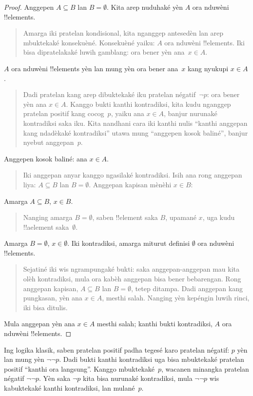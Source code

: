 \documentclass[../../../include/open-logic-section]{subfiles}
\begin{document}
\begin{proof}
  Anggepen $A \subseteq B$ lan $B = \emptyset$.
  Kita arep nuduhaké yèn $A$ ora nduwèni !!{element}s.
  \begin{quote}
    Amarga iki pratelan kondisional, kita nganggep
    antesedèn lan arep mbuktekaké konsekuèné.
    Konsekuèné yaiku: $A$ ora nduwèni !!{element}s.
    Iki bisa dipratelakaké luwih gamblang: ora bener
    yèn ana~$x \in A$.
  \end{quote}
  $A$ ora nduwèni !!{element}s yèn lan mung yèn
  ora bener ana~$x$ kang nyukupi $x \in A$.
  \begin{quote}
    Dadi pratelan kang arep dibuktekaké iku pratelan
    négatif~$\lnot p$: ora bener yèn ana $x \in A$.
    Kanggo bukti kanthi kontradiksi, kita kudu nganggep
    pratelan positif kang cocog~$p$, yaiku ana
    $x \in A$, banjur nurunaké kontradiksi saka iku.
    Kita nandhani cara iki kanthi nulis
    ``kanthi anggepan kang ndadèkaké kontradiksi''
    utawa mung ``anggepen kosok baliné'', banjur
    nyebut anggepan~$p$.
  \end{quote}
  Anggepen kosok baliné: ana $x \in A$.
  \begin{quote}
    Iki anggepan anyar kanggo ngasilaké kontradiksi.
    Isih ana rong anggepan liya: $A \subseteq B$
    lan $B = \emptyset$. Anggepan kapisan mènèhi
    $x \in B$:
  \end{quote}
  Amarga $A \subseteq B$, $x \in B$.
  \begin{quote}
    Nanging amarga $B = \emptyset$, saben !!{element}
    saka $B$, upamané $x$, uga kudu !!a{element}
    saka~$\emptyset$.
  \end{quote}
  Amarga $B = \emptyset$, $x \in \emptyset$.
  Iki kontradiksi, amarga miturut definisi $\emptyset$
  ora nduwèni !!{element}s.
  \begin{quote}
    Sejatiné iki wis ngrampungaké bukti: saka
    anggepan-anggepan mau kita olèh kontradiksi,
    mula ora kabèh anggepan bisa bener bebarengan.
    Rong anggepan kapisan, $A \subseteq B$ lan
    $B = \emptyset$, tetep ditampa. Dadi anggepan
    kang pungkasan, yèn ana $x \in A$, mesthi salah.
    Nanging yèn kepéngin luwih rinci, iki bisa ditulis.
  \end{quote}
  Mula anggepan yèn ana $x \in A$ mesthi salah;
  kanthi bukti kontradiksi, $A$ ora nduwèni !!{element}s.
\end{proof}

Ing logika klasik, saben pratelan positif padha tegesé karo pratelan
négatif: $p$ yèn lan mung yèn $\lnot\lnot p$.
Dadi bukti kanthi kontradiksi uga bisa mbuktekaké
pratelan positif ``kanthi ora langsung''.
Kanggo mbuktekaké~$p$, wacanen minangka
pratelan négatif $\lnot\lnot p$. Yèn saka
$\lnot p$ kita bisa nurunaké kontradiksi,
mula $\lnot\lnot p$ wis kabuktekaké kanthi
kontradiksi, lan mulané~$p$.
\end{document}
